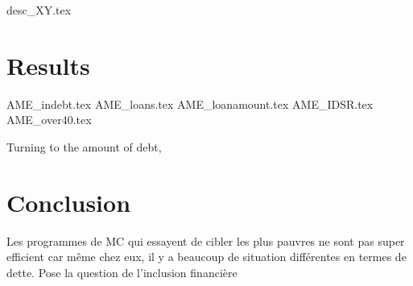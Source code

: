 \documentclass[a4paper, 11pt, onecolumn]{article}
\begin{document}
{desc_XY.tex}







\newpage
\section{Results}


{AME_indebt.tex}
{AME_loans.tex}
{AME_loanamount.tex}
{AME_IDSR.tex}
{AME_over40.tex}




Turning to the amount of debt, 









\newpage
\section*{Conclusion}
\label{Conclusion}

Les programmes de MC qui essayent de cibler les plus pauvres ne sont pas super efficient car même chez eux, il y a beaucoup de situation différentes en termes de dette.
Pose la question de l'inclusion financière


\clearpage
\newpage
%

\end{document}
